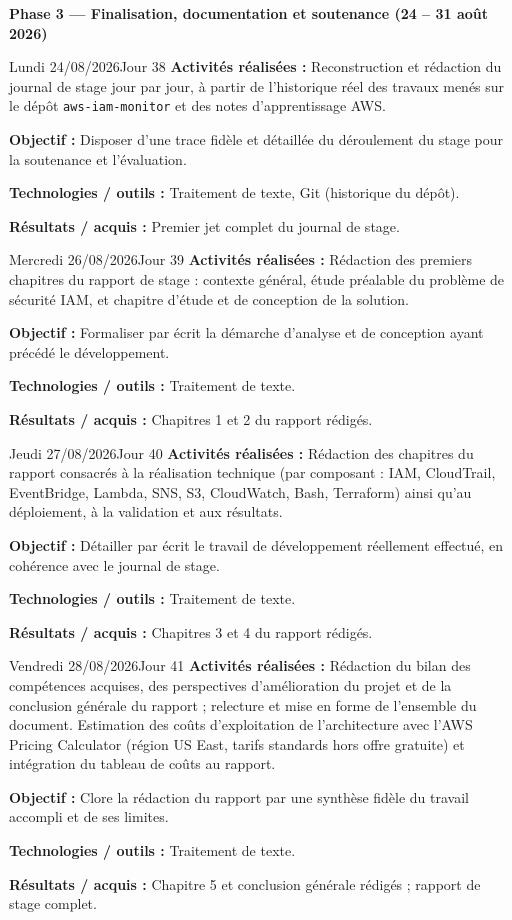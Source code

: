 \documentclass[11pt,a4paper]{article}
\newcommand{\journalfield}[2]{{\color{primaryblue}\textbf{#1 :}} #2\par\smallskip}
\newcommand{\phasebanner}[1]{%
  \begin{center}
  \colorbox{accentorange}{\parbox{0.9\linewidth}{\centering\color{white}\bfseries\large #1}}
  \end{center}
  \vspace{4pt}
}
\begin{document}
\phasebanner{Phase 3 --- Finalisation, documentation et soutenance (24 -- 31 août 2026)}

\begin{journalday}{Lundi 24/08/2026}{Jour 38}
\journalfield{Activités réalisées}{Reconstruction et rédaction du journal de stage jour par jour, à partir de l'historique réel des travaux menés sur le dépôt \texttt{aws-iam-monitor} et des notes d'apprentissage AWS.}
\journalfield{Objectif}{Disposer d'une trace fidèle et détaillée du déroulement du stage pour la soutenance et l'évaluation.}
\journalfield{Technologies / outils}{Traitement de texte, Git (historique du dépôt).}
\journalfield{Résultats / acquis}{Premier jet complet du journal de stage.}
\end{journalday}

\begin{journalday}{Mercredi 26/08/2026}{Jour 39}
\journalfield{Activités réalisées}{Rédaction des premiers chapitres du rapport de stage : contexte général, étude préalable du problème de sécurité IAM, et chapitre d'étude et de conception de la solution.}
\journalfield{Objectif}{Formaliser par écrit la démarche d'analyse et de conception ayant précédé le développement.}
\journalfield{Technologies / outils}{Traitement de texte.}
\journalfield{Résultats / acquis}{Chapitres 1 et 2 du rapport rédigés.}
\end{journalday}

\begin{journalday}{Jeudi 27/08/2026}{Jour 40}
\journalfield{Activités réalisées}{Rédaction des chapitres du rapport consacrés à la réalisation technique (par composant : IAM, CloudTrail, EventBridge, Lambda, SNS, S3, CloudWatch, Bash, Terraform) ainsi qu'au déploiement, à la validation et aux résultats.}
\journalfield{Objectif}{Détailler par écrit le travail de développement réellement effectué, en cohérence avec le journal de stage.}
\journalfield{Technologies / outils}{Traitement de texte.}
\journalfield{Résultats / acquis}{Chapitres 3 et 4 du rapport rédigés.}
\end{journalday}

\begin{journalday}{Vendredi 28/08/2026}{Jour 41}
\journalfield{Activités réalisées}{Rédaction du bilan des compétences acquises, des perspectives d'amélioration du projet et de la conclusion générale du rapport ; relecture et mise en forme de l'ensemble du document. Estimation des coûts d'exploitation de l'architecture avec l'AWS Pricing Calculator (région US East, tarifs standards hors offre gratuite) et intégration du tableau de coûts au rapport.}
\journalfield{Objectif}{Clore la rédaction du rapport par une synthèse fidèle du travail accompli et de ses limites.}
\journalfield{Technologies / outils}{Traitement de texte.}
\journalfield{Résultats / acquis}{Chapitre 5 et conclusion générale rédigés ; rapport de stage complet.}
\end{journalday}
\end{document}
